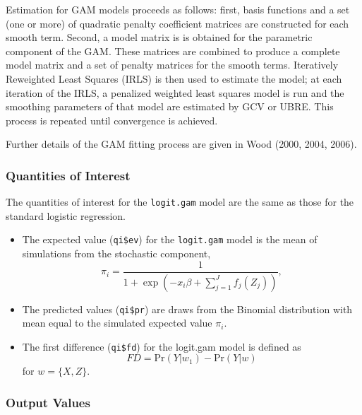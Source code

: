 Estimation for GAM models proceeds as follows: first, basis functions and a set (one or more) of quadratic penalty coefficient matrices are constructed for each smooth term. Second, a model matrix is is obtained for the parametric component of the GAM. These matrices are combined to produce a complete model matrix and a set of penalty matrices for the smooth terms. Iteratively Reweighted Least Squares (IRLS) is then used to estimate the model; at each iteration of the IRLS, a penalized weighted least squares model is run and the smoothing parameters of that model are estimated by GCV or UBRE. This process is repeated until convergence is achieved. 

Further details of the GAM fitting process are given in Wood (2000, 2004, 2006). 




\subsubsection{Quantities of Interest}
The quantities of interest for the {\tt logit.gam} model are the same as those for the standard logistic regression. 
\begin{itemize}
\item The expected value ({\tt qi\$ev}) for the {\tt logit.gam} model is the mean of simulations from the stochastic component,  
\begin{equation*}
\pi_{i} = \frac{1}{1 + \exp \left(-x_{i}\beta + \sum_{j=1}^{J} f_j(Z_j) \right)},
\end{equation*}


\item The predicted values ({\tt qi\$pr}) are draws from the Binomial distribution with mean equal to the simulated expected value $\pi_{i}$.

\item The first difference ({\tt qi\$fd}) for the logit.gam model is defined as 
\begin{equation*}
FD = \text{Pr}(Y| w_{1}) - \text{Pr}(Y| w)
\end{equation*}
for $w=\{X, Z\}$.
\end{itemize}



\subsubsection{Output Values}



